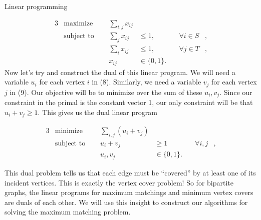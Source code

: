 \documentclass[11pt]{article}
\renewcommand{\'}{^{'}}
\begin{document}
\begin{section}{Linear programming}

	\begin{alignat}{3}
		& \text{maximize } & \sum_{i,j} x_{ij}& \\
		& \text{subject to } \quad & \sum_{j} x_{ij} & \leq 1, & \quad \forall i\in S&, \\
				     &\quad & \sum_{i} x_{ij} & \leq 1, & \quad \forall j\in T &, \\
				&& x_{ij} & \in \{0,1\}.
	\end{alignat}
	Now let's try and construct the dual of this linear program. We will need a variable 
	$u_i$ for each vertex $i$ in (8). Similarly, we need a variable $v_j$ for each vertex $j$ in 
	(9). Our objective will be to minimize over the sum of these $u_i,v_j$. Since our constraint 
	in the primal is the constant vector 1, our only constraint will be that $u_i + v_j \geq 1$. 
	This gives us the dual linear program


	\begin{alignat}{3}
		& \text{minimize } & \sum_{i,j} (u_i + v_j)& \\
		& \text{subject to } \quad & u_i + v_j & \geq 1 & \quad \forall i,j &, \\
				    && u_i,v_j & \in \{0,1\}.
	\end{alignat}


	This dual problem tells us that each edge must be ``covered'' by at least one of its incident 
	vertices. This is exactly the vertex cover problem! So for bipartite graphs, the linear 
	programs for maximum matchings and minimum vertex covers are duals of each other. We will 
	use this insight to construct our algorithms for solving the maximum matching problem.\\	
\end{section}
\end{document}
